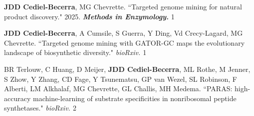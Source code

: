 

 \vspace{-2mm}

\begin{cvpubs}


\cvpub
{\textbf{JDD Cediel-Becerra}, MG Chevrette. ``Targeted genome mining for natural product discovery." 2025. \textit{\textbf{Methods in Enzymology.}} \textit{\textbf{}}}
{1}

\end{cvpubs}








 \vspace{-2mm}

\begin{cvpubs}


\cvpub
{\textbf{JDD Cediel-Becerra}, A Cumsile, S Guerra, Y Ding, Vd Crecy-Lagard, MG Chevrette. ``Targeted genome mining with GATOR-GC maps the evolutionary landscape of biosynthetic diversity." \textit{bioRxiv. \textbf{}}}
{1}

\cvpub
{BR Terlouw, C Huang, D Meijer, \textbf{JDD Cediel-Becerra}, ML Rothe, M Jenner, S Zhow, Y Zhang, CD Fage, Y Tsunematsu, GP van Wezel, SL Robinson, F Alberti, LM Alkhalaf, MG Chevrette, GL Challis, MH Medema. ``PARAS: high-accuracy machine-learning of substrate specificities in nonribosomal peptide synthetases." \textit{bioRxiv. \textbf{}}}
{2}


\end{cvpubs}
